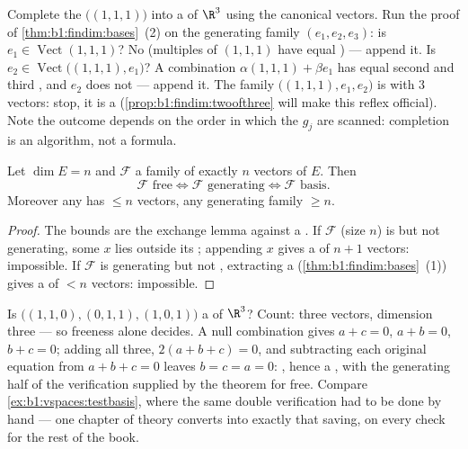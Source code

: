 \begin{example}
\label{ex:b1:findim:completion}
Complete the  $\bigl((1,1,1)\bigr)$ into a  of
$\R^3$ using the canonical vectors. Run the proof of
\cref{thm:b1:findim:bases}~(2) on the generating family $(e_1,
e_2, e_3)$: is $e_1 \in \operatorname{Vect}(1,1,1)$? No (multiples
of $(1,1,1)$ have equal ) --- append it. Is $e_2 \in
\operatorname{Vect}\bigl((1,1,1), e_1\bigr)$? A combination
$\alpha(1,1,1) + \beta e_1$ has equal second and third
, and $e_2$ does not --- append it. The family
$\bigl((1,1,1), e_1, e_2\bigr)$ is  with $3$ vectors: stop,
it is a  (\cref{prop:b1:findim:twoofthree} will make this
reflex official). Note the outcome depends on the order in which
the $g_j$ are scanned: completion is an algorithm, not a formula.
\end{example}

\begin{proposition}\label{prop:b1:findim:twoofthree}
Let $\dim E = n$ and $\mathcal{F}$ a family of exactly $n$ vectors
of $E$. Then
\[
\mathcal{F} \text{ free} \iff \mathcal{F} \text{ generating} \iff
\mathcal{F} \text{ basis}.
\]
Moreover any  has $\leq n$ vectors, any generating family
$\geq n$.
\end{proposition}

\begin{proof}
The  bounds are the exchange lemma against a . If
$\mathcal{F}$ (size $n$) is  but not generating, some $x$ lies
outside its ; appending $x$ gives a  of $n + 1$
vectors: impossible. If $\mathcal{F}$ is generating but not ,
extracting a  (\cref{thm:b1:findim:bases}~(1)) gives a  of
$< n$ vectors: impossible.
\end{proof}

\begin{example}
\label{ex:b1:findim:twoofthreerun}
Is $\bigl((1,1,0), (0,1,1), (1,0,1)\bigr)$ a  of $\R^3$?
Count: three vectors, dimension three --- so freeness alone
decides. A null combination gives $a + c = 0$, $a + b = 0$, $b +
c = 0$; adding all three, $2(a + b + c) = 0$, and subtracting
each original equation from $a + b + c = 0$ leaves $b = c = a =
0$: , hence a , with the generating half of the
verification supplied by the theorem for free. Compare
\cref{ex:b1:vspaces:testbasis}, where the same double
verification had to be done by hand --- one chapter of theory
converts into exactly that saving, on every  check for the
rest of the book.
\end{example}

